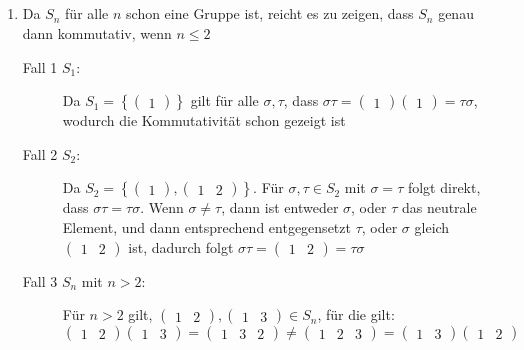 \documentclass[sectionformat = aufgabe]{gadsescript}
\begin{document}
\subsection{}
\begin{enumerate}[label=(\alph*)]
	\item Da $ S_n $ für alle $ n $ schon eine Gruppe ist, reicht es zu zeigen, dass $ S_n $ genau dann kommutativ, wenn $ n \leq 2 $
		\begin{description}
			\item[Fall 1 $ S_1 $:] Da $ S_1 = \left\{ \begin{pmatrix} 1 \end{pmatrix}  \right\}  $ gilt für alle $ \sigma, \tau $, dass $ \sigma \tau = \begin{pmatrix} 1 \end{pmatrix} \begin{pmatrix} 1 \end{pmatrix} = \tau \sigma $, wodurch die Kommutativität schon gezeigt ist
			\item[Fall 2 $ S_2 $:] Da $ S_2 = \left\{ \begin{pmatrix} 1 \end{pmatrix}, \begin{pmatrix} 1 & 2 \end{pmatrix}   \right\}  $.
				Für $ \sigma, \tau \in S_2 $ mit $ \sigma = \tau $ folgt direkt, dass $ \sigma \tau = \tau \sigma $.
				Wenn $ \sigma \neq \tau $, dann ist entweder $ \sigma $, oder $ \tau $ das neutrale Element, und dann entsprechend entgegensetzt $ \tau $, oder $ \sigma $ gleich $ \begin{pmatrix} 1 & 2 \end{pmatrix}  $ ist, dadurch folgt $ \sigma \tau = \begin{pmatrix} 1 & 2 \end{pmatrix} = \tau \sigma $ 
			\item[Fall 3 $ S_n $ mit $ n > 2 $:]
				Für $ n > 2 $ gilt, $ \begin{pmatrix} 1 & 2 \end{pmatrix} , \begin{pmatrix} 1 & 3 \end{pmatrix} \in S_n $, für die gilt:
				$ \begin{pmatrix} 1 & 2 \end{pmatrix} \begin{pmatrix} 1 & 3 \end{pmatrix} = \begin{pmatrix} 1 & 3 & 2 \end{pmatrix} \neq \begin{pmatrix} 1 & 2 & 3 \end{pmatrix} = \begin{pmatrix} 1 & 3 \end{pmatrix} \begin{pmatrix} 1 & 2 \end{pmatrix}  $


\end{description}
\end{enumerate}
\end{document}
